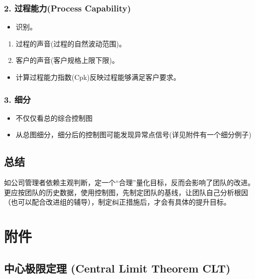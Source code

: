 \hypertarget{ux8fc7ux7a0bux80fdux529bprocess-capability}{%
\subsubsection{2. 过程能力(Process
Capability)}\label{ux8fc7ux7a0bux80fdux529bprocess-capability}}

\begin{itemize}
\tightlist
\item
  识别。
\end{itemize}

\begin{enumerate}
\tightlist
\item
  过程的声音(过程的自然波动范围)。
\item
  客户的声音(客户规格上限下限)。
\end{enumerate}

\begin{itemize}
\tightlist
\item
  计算过程能力指数(Cpk)反映过程能够满足客户要求。
\end{itemize}

\hypertarget{ux7ec6ux5206}{%
\subsubsection{3. 细分}\label{ux7ec6ux5206}}

\begin{itemize}
\tightlist
\item
  不仅仅看总的综合控制图
\item
  从总图细分，细分后的控制图可能发现异常点信号(详见附件有一个细分例子)
\end{itemize}

\hypertarget{ux603bux7ed3}{%
\subsection{总结}\label{ux603bux7ed3}}

如公司管理者依赖主观判断，定一个``合理''量化目标，反而会影响了团队的改进。更应按团队的历史数据，使用控制图，先制定团队的基线，让团队自己分析根因（也可以配合改进组的辅导），制定纠正措施后，才会有具体的提升目标。

\hypertarget{ux9644ux4ef6}{%
\section{附件}\label{ux9644ux4ef6}}

\hypertarget{ux4e2dux5fc3ux6781ux9650ux5b9aux7406-central-limit-theorem-clt}{%
\subsection{中心极限定理 (Central Limit Theorem
CLT)}\label{ux4e2dux5fc3ux6781ux9650ux5b9aux7406-central-limit-theorem-clt}}

